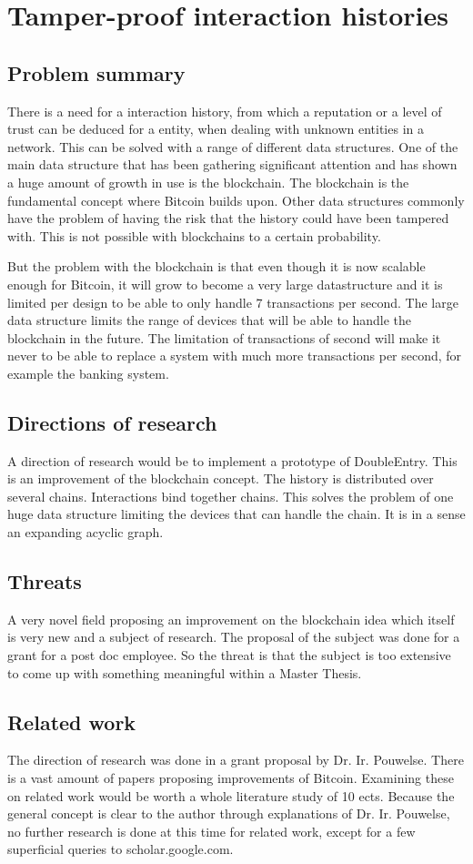 \section{Tamper-proof interaction histories}

\subsection*{Problem summary}
There is a need for a interaction history, from which a reputation or a level of trust can be deduced for a entity, when dealing with unknown entities in a network.
This can be solved with a range of different data structures.
One of the main data structure that has been gathering significant attention and has shown a huge amount of growth in use is the blockchain.
The blockchain is the fundamental concept where Bitcoin builds upon.
Other data structures commonly have the problem of having the risk that the history could have been tampered with.
This is not possible with blockchains to a certain probability.

But the problem with the blockchain is that even though it is now scalable enough for Bitcoin,
it will grow to become a very large datastructure and it is limited per design to be able to only handle 7 transactions per second.
The large data structure limits the range of devices that will be able to handle the blockchain in the future.
The limitation of transactions of second will make it never to be able to replace a system with much more transactions per second,
for example the banking system.

\subsection*{Directions of research}
A direction of research would be to implement a prototype of DoubleEntry.
This is an improvement of the blockchain concept.
The history is distributed over several chains. 
Interactions bind together chains.
This solves the problem of one huge data structure limiting the devices that can handle the chain.
It is in a sense an expanding acyclic graph.

\subsection*{Threats}
A very novel field proposing an improvement on the blockchain idea which itself is very new and a subject of research.
The proposal of the subject was done for a grant for a post doc employee.
So the threat is that the subject is too extensive to come up with something meaningful within a Master Thesis.

\subsection*{Related work}
The direction of research was done in a grant proposal by Dr. Ir. Pouwelse.
There is a vast amount of papers proposing improvements of Bitcoin.
Examining these on related work would be worth a whole literature study of 10 ects.
Because the general concept is clear to the author through explanations of Dr. Ir. Pouwelse,
no further research is done at this time for related work,
except for a few superficial queries to scholar.google.com.
